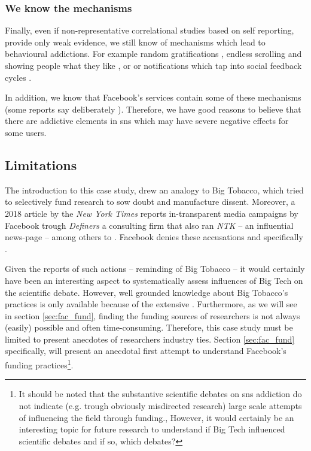 \subsubsection{We know the mechanisms}
Finally, even if non-representative correlational studies based on self reporting, provide only weak evidence,
we still know of mechanisms which lead to behavioural addictions.
For example random gratifications \citep{haw_random-ratio_2008}, endless scrolling and showing people what they like \citep{montag_addictive_2019}, or  or  notifications which tap into social feedback cycles \citet{stefanou_facebooks_2018}. 

In addition, we know that Facebook's services contain some of these mechanisms (some reports say deliberately \citep{manjoo_facebook_2017, seetharaman_facebook_2020, hao_how_2021}).
Therefore, we have good reasons to believe that there are addictive elements in \gls{sns} which may have severe negative effects for some users.

\subsection{Limitations}
The introduction to this case study, drew an analogy to Big Tobacco, which tried to selectively fund research to sow doubt and manufacture dissent. 
Moreover, a 2018 article by the \emph{New York Times} reports in-transparent media campaigns by Facebook trough \textit{Definers} a consulting firm that also ran \emph{NTK} -- an influential news-page -- among others to  \citep{frenkel_delay_2018}.
Facebook denies these accusations and specifically  \citep{facebook_new_2018}. 

Given the reports of such actions -- reminding of Big Tobacco -- it would certainly have been an interesting aspect to systematically assess influences of Big Tech on the scientific debate.
However, well grounded knowledge about Big Tobacco's practices is only available because of the extensive  \citep[p 297]{oreskes_merchants_2010}.
Furthermore, as we will see in section \ref{sec:fac_fund}, finding the funding sources of researchers is not always (easily) possible and often time-consuming. 
Therefore, this case study must be limited to present anecdotes of researchers industry ties.
Section \ref{sec:fac_fund} specifically, will present an anecdotal first attempt to understand Facebook's funding practices\footnote{It should be noted that the substantive scientific debates on \gls{sns} addiction do not indicate (e.g. trough obviously misdirected research) large scale attempts of influencing the field through funding., However, it would certainly be an interesting topic for future research to understand if Big Tech influenced scientific debates and if so, which debates?}.

